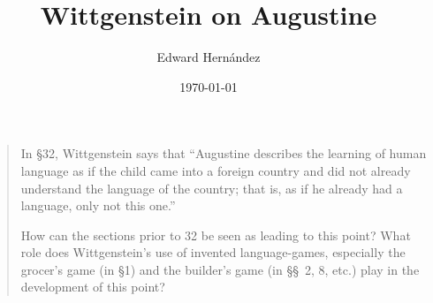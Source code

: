 \documentclass[man,12pt,natbib]{apa6}
\begin{document}
 \title{Wittgenstein on Augustine}
\author{Edward Hern\'{a}ndez}
\date{\today}

\maketitle

\begin{quote}
	In \S 32, Wittgenstein says that ``Augustine describes the learning of
	human language as if the child came into a foreign country and did not
	already understand the language of the country; that is, as if he already
	had a language, only not this one.''

	How can the sections prior to 32 be seen as leading to this point?  What
	role does Wittgenstein's use of invented language-games, especially the
	grocer's game (in \S 1) and the builder's game (in \S\S~2, 8, etc.) play in
	the development of this point?

\end{quote}
\clearpage
\end{document}
